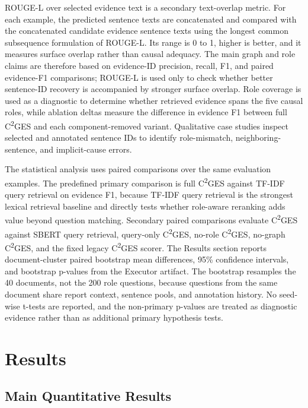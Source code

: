 \documentclass{ieeeaccess}
\begin{document}
ROUGE-L over selected evidence text is a secondary text-overlap metric. For each example, the predicted sentence texts are concatenated and compared with the concatenated candidate evidence sentence texts using the longest common subsequence formulation of ROUGE-L. Its range is 0 to 1, higher is better, and it measures surface overlap rather than causal adequacy. The main graph and role claims are therefore based on evidence-ID precision, recall, F1, and paired evidence-F1 comparisons; ROUGE-L is used only to check whether better sentence-ID recovery is accompanied by stronger surface overlap. Role coverage is used as a diagnostic to determine whether retrieved evidence spans the five causal roles, while ablation deltas measure the difference in evidence F1 between full C\textsuperscript{2}GES and each component-removed variant. Qualitative case studies inspect selected and annotated sentence IDs to identify role-mismatch, neighboring-sentence, and implicit-cause errors.

The statistical analysis uses paired comparisons over the same evaluation examples. The predefined primary comparison is full C\textsuperscript{2}GES against TF-IDF query retrieval on evidence F1, because TF-IDF query retrieval is the strongest lexical retrieval baseline and directly tests whether role-aware reranking adds value beyond question matching. Secondary paired comparisons evaluate C\textsuperscript{2}GES against SBERT query retrieval, query-only C\textsuperscript{2}GES, no-role C\textsuperscript{2}GES, no-graph C\textsuperscript{2}GES, and the fixed legacy C\textsuperscript{2}GES scorer. The Results section reports document-cluster paired bootstrap mean differences, 95\% confidence intervals, and bootstrap p-values from the Executor artifact. The bootstrap resamples the 40 documents, not the 200 role questions, because questions from the same document share report context, sentence pools, and annotation history. No seed-wise t-tests are reported, and the non-primary p-values are treated as diagnostic evidence rather than as additional primary hypothesis tests.

\section{Results}

\label{sec:results}

\subsection{Main Quantitative Results}
\end{document}
